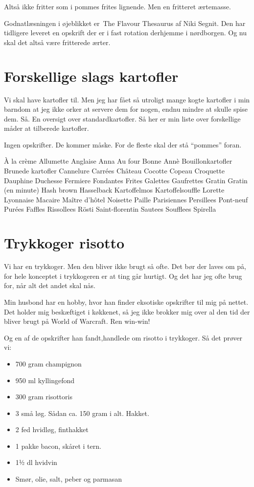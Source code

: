 \documentclass[
]{book}
\providecommand{\tightlist}{%
  \setlength{\itemsep}{0pt}\setlength{\parskip}{0pt}}
\begin{document}
Altså ikke fritter som i pommes frites lignende. Men en fritteret ærtemasse.

Godnatlæsningen i øjeblikket er~The Flavour Thesaurus af Niki Segnit. Den har tidligere leveret en opskrift der er i fast rotation derhjemme i nørdborgen. Og nu skal det altså være fritterede ærter.

\hypertarget{forskellige-slags-kartofler}{%
\section{Forskellige slags kartofler}\label{forskellige-slags-kartofler}}

Vi skal have kartofler til. Men jeg har fået så utroligt mange kogte kartofler i min barndom at jeg ikke orker at servere dem for nogen, endnu mindre at skulle spise dem. Så. En oversigt over standardkartofler. Så her er min liste over forskellige måder at tilberede kartofler.

Ingen opskrifter. De kommer måske. For de fleste skal der stå ``pommes'' foran.

À la crème
Allumette
Anglaise
Anna
Au four
Bonne Annè
Bouillonkartofler
Brunede kartofler
Cannelure
Carrées
Château
Cocotte
Copeau
Croquette
Dauphine
Duchesse
Fermiere
Fondantes
Frites
Galettes
Gaufrettes
Gratin
Gratin (en minute)
Hash brown
Hasselback
Kartoffelmos
Kartoffelsouffle
Lorette
Lyonnaise
Macaire
Maître d'hôtel
Noisette
Paille
Parisiennes
Persillees
Pont-neuf
Purées
Faffles
Rissollees
Rösti
Saint-florentin
Sautees
Soufflees
Spirella

\hypertarget{trykkoger-risotto}{%
\section{Trykkoger risotto}\label{trykkoger-risotto}}

Vi har en trykkoger. Men den bliver ikke brugt så ofte. Det bør der laves om på, for hele konceptet i trykkogeren er at ting går hurtigt. Og det har jeg ofte brug for, når alt det andet skal nås.

Min husbond har en hobby, hvor han finder eksotiske opskrifter til mig på nettet. Det holder mig beskæftiget i køkkenet, så jeg ikke brokker mig over al den tid der bliver brugt på World of Warcraft. Ren win-win!

Og en af de opskrifter han fandt,handlede om risotto i trykkoger. Så det prøver vi:

\begin{itemize}
\tightlist
\item
  700 gram champignon
\item
  950 ml kyllingefond
\item
  300 gram risottoris
\item
  3 små løg. Sådan ca. 150 gram i alt. Hakket.
\item
  2 fed hvidløg, finthakket
\item
  1 pakke bacon, skåret i tern.
\item
  1½ dl hvidvin
\item
  Smør, olie, salt, peber og parmasan
\end{itemize}
\end{document}
